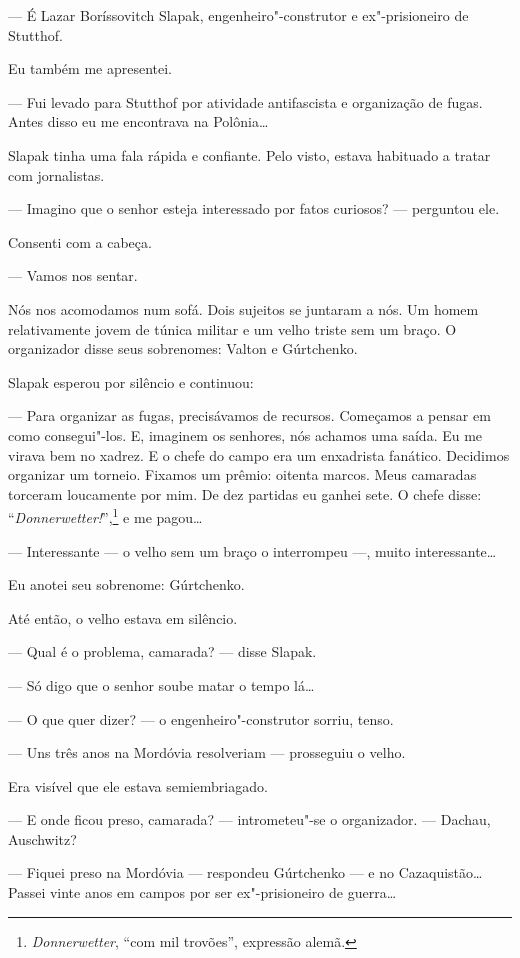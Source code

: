 --- É Lazar Boríssovitch Slapak, engenheiro"-construtor e ex"-prisioneiro de Stutthof.

Eu também me apresentei.

--- Fui levado para Stutthof por atividade antifascista e organização de
fugas. Antes disso eu me encontrava na Polônia\ldots{}

Slapak tinha uma fala rápida e confiante. Pelo visto, estava habituado a
tratar com jornalistas.

--- Imagino que o senhor esteja interessado por fatos curiosos? ---
perguntou ele.

Consenti com a cabeça.

--- Vamos nos sentar.

Nós nos acomodamos num sofá. Dois sujeitos se juntaram a nós. Um homem
relativamente jovem de túnica militar e um velho triste sem um braço. O
organizador disse seus sobrenomes: Valton e Gúrtchenko.

Slapak esperou por silêncio e continuou:

--- Para organizar as fugas, precisávamos de recursos. Começamos a
pensar em como consegui"-los. E, imaginem os senhores, nós achamos uma
saída. Eu me virava bem no xadrez. E o chefe do campo era um enxadrista
fanático. Decidimos organizar um torneio. Fixamos um prêmio: oitenta
marcos. Meus camaradas torceram loucamente por mim. De dez partidas eu
ganhei sete. O chefe disse: ``\emph{Donnerwetter!}'',\footnote{\emph{Donnerwetter}, ``com
  mil trovões'', expressão alemã.} e me pagou\ldots{}

--- Interessante --- o velho sem um braço o interrompeu ---, muito
interessante\ldots{}

Eu anotei seu sobrenome: Gúrtchenko.

Até então, o velho estava em silêncio.

--- Qual é o problema, camarada? --- disse Slapak.

--- Só digo que o senhor soube matar o tempo lá\ldots{}

--- O que quer dizer? --- o engenheiro"-construtor sorriu, tenso.

--- Uns três anos na Mordóvia resolveriam --- prosseguiu o velho.

Era visível que ele estava semiembriagado.

--- E onde ficou preso, camarada? --- intrometeu"-se o organizador. ---
Dachau, Auschwitz?

--- Fiquei preso na Mordóvia --- respondeu Gúrtchenko --- e no
Cazaquistão\ldots{} Passei vinte anos em campos por ser ex"-prisioneiro de
guerra\ldots{}

